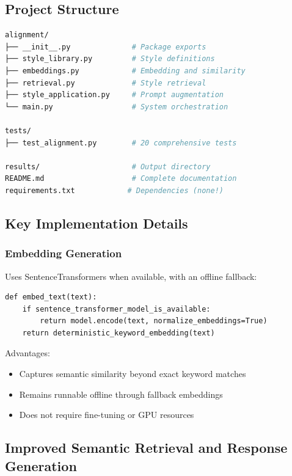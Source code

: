 \documentclass[11pt,a4paper]{article}
\begin{document}
\subsection{Project Structure}

\begin{lstlisting}[language=bash]
alignment/
├── __init__.py              # Package exports
├── style_library.py         # Style definitions
├── embeddings.py            # Embedding and similarity
├── retrieval.py             # Style retrieval
├── style_application.py     # Prompt augmentation
└── main.py                  # System orchestration

tests/
├── test_alignment.py        # 20 comprehensive tests

results/                     # Output directory
README.md                    # Complete documentation
requirements.txt            # Dependencies (none!)
\end{lstlisting}

\subsection{Key Implementation Details}

\subsubsection{Embedding Generation}

Uses SentenceTransformers when available, with an offline fallback:

\begin{lstlisting}
def embed_text(text):
    if sentence_transformer_model_is_available:
        return model.encode(text, normalize_embeddings=True)
    return deterministic_keyword_embedding(text)
\end{lstlisting}

Advantages:
\begin{itemize}
    \item Captures semantic similarity beyond exact keyword matches
    \item Remains runnable offline through fallback embeddings
    \item Does not require fine-tuning or GPU resources
\end{itemize}

\subsection{Improved Semantic Retrieval and Response Generation}
\end{document}
